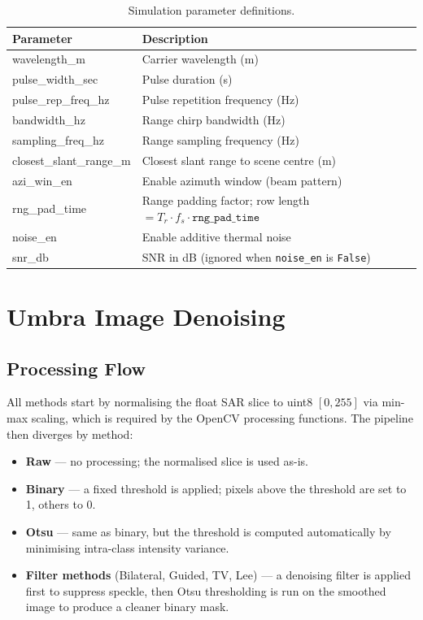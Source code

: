 \documentclass[12pt]{article}
\begin{document}
\begin{table}[H]
    \centering
    \caption{Simulation parameter definitions.}
    \begin{tabular}{>{\ttfamily}lp{}}
        \toprule
        \normalfont Parameter & Description \\
        \midrule
        wavelength\_m           & Carrier wavelength (m) \\
        pulse\_width\_sec        & Pulse duration (s) \\
        pulse\_rep\_freq\_hz     & Pulse repetition frequency (Hz) \\
        bandwidth\_hz           & Range chirp bandwidth (Hz) \\
        sampling\_freq\_hz      & Range sampling frequency (Hz) \\
        closest\_slant\_range\_m & Closest slant range to scene centre (m) \\
        azi\_win\_en            & Enable azimuth window (beam pattern) \\
        rng\_pad\_time          & Range padding factor; row length $= T_r \cdot f_s \cdot \mathtt{rng\_pad\_time}$ \\
        noise\_en               & Enable additive thermal noise \\
        snr\_db                 & SNR in dB (ignored when \texttt{noise\_en} is \texttt{False}) \\
        \bottomrule
    \end{tabular}
\end{table}

\section{Umbra Image Denoising}

\subsection{Processing Flow}

All methods start by normalising the float SAR slice to uint8 $[0, 255]$ via
min-max scaling, which is required by the OpenCV processing functions.
The pipeline then diverges by method:

\begin{itemize}
    \item \textbf{Raw} — no processing; the normalised slice is used as-is.
    \item \textbf{Binary} — a fixed threshold is applied; pixels above the
          threshold are set to 1, others to 0.
    \item \textbf{Otsu} — same as binary, but the threshold is computed
          automatically by minimising intra-class intensity variance.
    \item \textbf{Filter methods} (Bilateral, Guided, TV, Lee) — a denoising
          filter is applied first to suppress speckle, then Otsu thresholding
          is run on the smoothed image to produce a cleaner binary mask.
\end{itemize}
\end{document}
